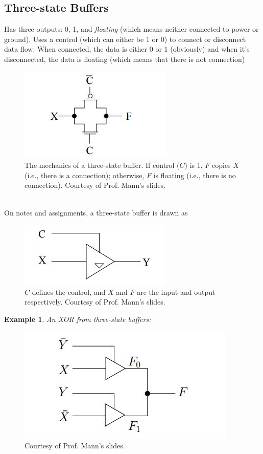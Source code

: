 \documentclass{report}
\newtheorem{ex}{Example}[section]
\begin{document}
\subsection{Three-state Buffers}
Has three outputs: 0, 1, and \textit{floating} (which means neither connected to power or ground). Uses a control (which can either be 1 or 0) to connect or disconnect data flow. When connected, the data is either 0 or 1 (obviously) and when it's disconnected, the data is floating (which means that there is not connection)
\begin{figure}[ht]
\begin{center}
        \includegraphics[scale=0.5]{tri_state_diagram.jpg}
\end{center}
\caption{The mechanics of a three-state buffer. If control ($C$) is 1, $F$ copies $X$ (i.e., there is a connection); otherwise, $F$ is floating (i.e., there is no connection). Courtesy of Prof. Mann's slides.}
\end{figure}\\
On notes and assignments, a three-state buffer is drawn as
\begin{figure}[ht]
\begin{center}
\includegraphics[scale=0.5]{tri_state_diagram2.jpg}
\end{center}
\caption{$C$ defines the control, and $X$ and $F$ are the input and output respectively. Courtesy of Prof. Mann's slides.}
\end{figure}
\newpage
\begin{ex}
An XOR from three-state buffers:
\end{ex}
\begin{figure}[ht]
\begin{center}
\includegraphics[scale=0.5]{tri_state_diagram3.jpg}
\end{center}
\caption{Courtesy of Prof. Mann's slides.}
\end{figure}
\end{document}
